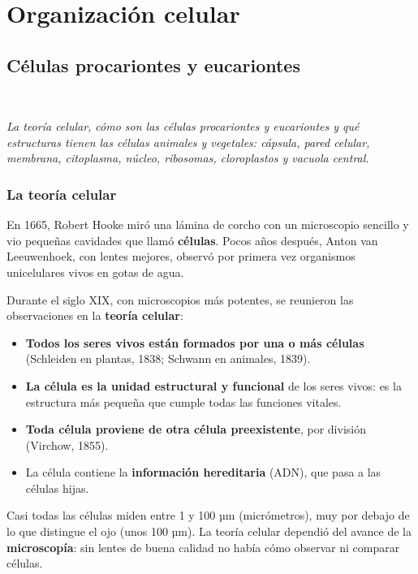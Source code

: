 \chapter{Organización celular}
\section[Células procariontes y eucariontes]{Células procariontes y eucariontes}
\modcomun\ \ {\color{gris}\itshape La teoría celular, cómo son las células procariontes y eucariontes y qué estructuras tienen las células animales y vegetales: cápsula, pared celular, membrana, citoplasma, núcleo, ribosomas, cloroplastos y vacuola central.\par}
\subsection{La teoría celular}
En 1665, Robert Hooke miró una lámina de corcho con un microscopio sencillo y vio pequeñas cavidades que llamó \textbf{células}. Pocos años después, Anton van Leeuwenhoek, con lentes mejores, observó por primera vez organismos unicelulares vivos en gotas de agua.

 

Durante el siglo XIX, con microscopios más potentes, se reunieron las observaciones en la \textbf{teoría celular}:

 
\begin{itemize}
  \item \textbf{Todos los seres vivos están formados por una o más células} (Schleiden en plantas, 1838; Schwann en animales, 1839).
  \item \textbf{La célula es la unidad estructural y funcional} de los seres vivos: es la estructura más pequeña que cumple todas las funciones vitales.
  \item \textbf{Toda célula proviene de otra célula preexistente}, por división (Virchow, 1855).
  \item La célula contiene la \textbf{información hereditaria} (ADN), que pasa a las células hijas.
\end{itemize}
  
\begin{clave} Casi todas las células miden entre 1 y 100 µm (micrómetros), muy por debajo de lo que distingue el ojo (unos 100 µm). La teoría celular dependió del avance de la \textbf{microscopía}: sin lentes de buena calidad no había cómo observar ni comparar células.\end{clave}
 
